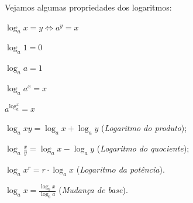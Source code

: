 \documentclass[../main.tex]{subfiles}
\begin{document}
  Vejamos algumas propriedades dos logaritmos:
  \begin{compactenum}[a.]
  \begin{multicols}{2}
  \item $\displaystyle \log_a x = y \Leftrightarrow a^y = x$
  \item $\displaystyle \log_a 1 = 0$
  \item $\displaystyle \log_a a = 1$
  \item $\displaystyle \log_a a^x = x$
   \item $\displaystyle a^{\log_a^x} = x$
    \end{multicols}
  \item $\displaystyle \log_a xy = \log_a x + \log_a y$ (\textit{Logaritmo do produto});\\
  \item $\displaystyle \log_a \frac{x}{y} = \log_a x - \log_a y$ (\textit{Logaritmo do quociente});
  \item $\displaystyle \log_a x^r = r\cdot\log_a x$ (\textit{Logaritmo da potência}).
  \item $\displaystyle \log_a x = \frac{\log_b x}{\log_b a}$ (\textit{Mudança de base}).
  \end{compactenum}
\end{document}
